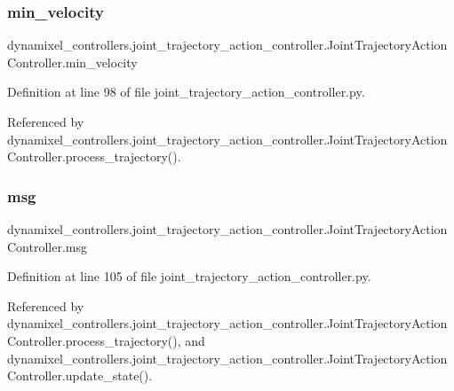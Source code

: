 \subsubsection{\texorpdfstring{min\+\_\+velocity}{min\_velocity}}
{\footnotesize\ttfamily dynamixel\+\_\+controllers.\+joint\+\_\+trajectory\+\_\+action\+\_\+controller.\+Joint\+Trajectory\+Action\+Controller.\+min\+\_\+velocity}



Definition at line 98 of file joint\+\_\+trajectory\+\_\+action\+\_\+controller.\+py.



Referenced by dynamixel\+\_\+controllers.\+joint\+\_\+trajectory\+\_\+action\+\_\+controller.\+Joint\+Trajectory\+Action\+Controller.\+process\+\_\+trajectory().

\mbox{\label{classdynamixel__controllers_1_1joint__trajectory__action__controller_1_1_joint_trajectory_action_controller_ae0386896abcb73f639f3b9c9348149a6}} 
\subsubsection{\texorpdfstring{msg}{msg}}
{\footnotesize\ttfamily dynamixel\+\_\+controllers.\+joint\+\_\+trajectory\+\_\+action\+\_\+controller.\+Joint\+Trajectory\+Action\+Controller.\+msg}



Definition at line 105 of file joint\+\_\+trajectory\+\_\+action\+\_\+controller.\+py.



Referenced by dynamixel\+\_\+controllers.\+joint\+\_\+trajectory\+\_\+action\+\_\+controller.\+Joint\+Trajectory\+Action\+Controller.\+process\+\_\+trajectory(), and dynamixel\+\_\+controllers.\+joint\+\_\+trajectory\+\_\+action\+\_\+controller.\+Joint\+Trajectory\+Action\+Controller.\+update\+\_\+state().

